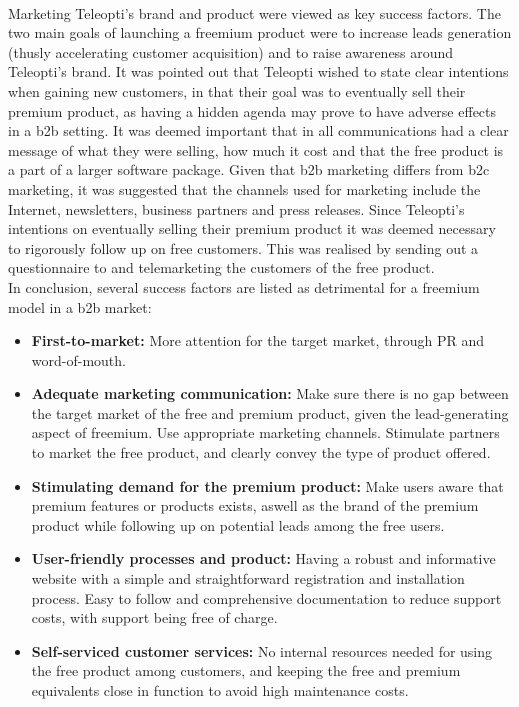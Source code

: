 {\newline
\\
Marketing Teleopti's brand and product were viewed as key success factors. The two main goals of launching a freemium product were to increase leads generation (thusly accelerating customer acquisition) and to raise awareness around Teleopti's brand. It was pointed out that Teleopti wished to state clear intentions when gaining new customers, in that their goal was to eventually sell their premium product, as having a hidden agenda may prove to have adverse effects in a \gls{b2b} setting. It was deemed important that in all communications had a clear message of what they were selling, how much it cost and that the free product is a part of a larger software package. Given that \gls{b2b} marketing differs from \gls{b2c} marketing, it was suggested that the channels used for marketing include the Internet, newsletters, business partners and press releases. Since Teleopti's intentions on eventually selling their premium product it was deemed necessary to rigorously follow up on free customers. This was realised by sending out a questionnaire to and telemarketing the customers of the free product. 
\newline
\\
In conclusion, several success factors are listed as detrimental for a freemium model in a \gls{b2b} market:
\begin{itemize}
    \item \textbf{First-to-market: }More attention for the target market, through PR and word-of-mouth. 
    \item \textbf{Adequate marketing communication: }Make sure there is no gap between the target market of the free and premium product, given the lead-generating aspect of freemium. Use appropriate marketing channels. Stimulate partners to market the free product, and clearly convey the type of product offered.
    \item \textbf{Stimulating demand for the premium product: }Make users aware that premium features or products exists, aswell as the brand of the premium product while following up on potential leads among the free users. 
    \item \textbf{User-friendly processes and product: }Having a robust and informative website with a simple and straightforward registration and installation process. Easy to follow and comprehensive documentation to reduce support costs, with support being free of charge.
    \item \textbf{Self-serviced customer services: }No internal resources needed for using the free product among customers, and keeping the free and premium equivalents close in function to avoid high maintenance costs. 
\end{itemize}

}
